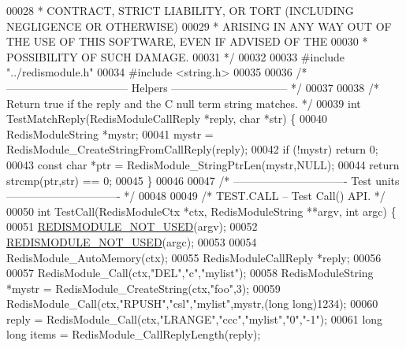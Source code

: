 \begin{DoxyCode}
00028 \textcolor{comment}{ * CONTRACT, STRICT LIABILITY, OR TORT (INCLUDING NEGLIGENCE OR OTHERWISE)}
00029 \textcolor{comment}{ * ARISING IN ANY WAY OUT OF THE USE OF THIS SOFTWARE, EVEN IF ADVISED OF THE}
00030 \textcolor{comment}{ * POSSIBILITY OF SUCH DAMAGE.}
00031 \textcolor{comment}{ */}
00032 
00033 \textcolor{preprocessor}{#}\textcolor{preprocessor}{include} \textcolor{preprocessor}{"../redismodule.h"}
00034 \textcolor{preprocessor}{#}\textcolor{preprocessor}{include} \textcolor{preprocessor}{<}\textcolor{preprocessor}{string}\textcolor{preprocessor}{.}\textcolor{preprocessor}{h}\textcolor{preprocessor}{>}
00035 
00036 \textcolor{comment}{/* --------------------------------- Helpers -------------------------------- */}
00037 
00038 \textcolor{comment}{/* Return true if the reply and the C null term string matches. */}
00039 \textcolor{keywordtype}{int} TestMatchReply(RedisModuleCallReply *reply, \textcolor{keywordtype}{char} *str) \{
00040     RedisModuleString *mystr;
00041     mystr = RedisModule\_CreateStringFromCallReply(reply);
00042     \textcolor{keywordflow}{if} (!mystr) \textcolor{keywordflow}{return} 0;
00043     \textcolor{keyword}{const} \textcolor{keywordtype}{char} *ptr = RedisModule\_StringPtrLen(mystr,NULL);
00044     \textcolor{keywordflow}{return} strcmp(ptr,str) == 0;
00045 \}
00046 
00047 \textcolor{comment}{/* ------------------------------- Test units ------------------------------- */}
00048 
00049 \textcolor{comment}{/* TEST.CALL -- Test Call() API. */}
00050 \textcolor{keywordtype}{int} TestCall(RedisModuleCtx *ctx, RedisModuleString **argv, \textcolor{keywordtype}{int} argc) \{
00051     \hyperlink{redismodule_8h_a46d75d81383a00bd6b941af6cadf64c2}{REDISMODULE\_NOT\_USED}(argv);
00052     \hyperlink{redismodule_8h_a46d75d81383a00bd6b941af6cadf64c2}{REDISMODULE\_NOT\_USED}(argc);
00053 
00054     RedisModule\_AutoMemory(ctx);
00055     RedisModuleCallReply *reply;
00056 
00057     RedisModule\_Call(ctx,\textcolor{stringliteral}{"DEL"},\textcolor{stringliteral}{"c"},\textcolor{stringliteral}{"mylist"});
00058     RedisModuleString *mystr = RedisModule\_CreateString(ctx,\textcolor{stringliteral}{"foo"},3);
00059     RedisModule\_Call(ctx,\textcolor{stringliteral}{"RPUSH"},\textcolor{stringliteral}{"csl"},\textcolor{stringliteral}{"mylist"},mystr,(\textcolor{keywordtype}{long} \textcolor{keywordtype}{long})1234);
00060     reply = RedisModule\_Call(ctx,\textcolor{stringliteral}{"LRANGE"},\textcolor{stringliteral}{"ccc"},\textcolor{stringliteral}{"mylist"},\textcolor{stringliteral}{"0"},\textcolor{stringliteral}{"-1"});
00061     \textcolor{keywordtype}{long} \textcolor{keywordtype}{long} items = RedisModule\_CallReplyLength(reply);

\end{DoxyCode}

